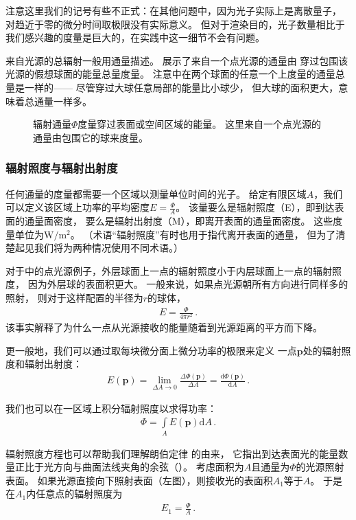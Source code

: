 注意这里我们的记号有些不正式：在其他问题中，因为光子实际上是离散量子，
对趋近于零的微分时间取极限没有实际意义。
但对于渲染目的，光子数量相比于我们感兴趣的度量是巨大的，在实践中这一细节不会有问题。

来自光源的总辐射一般用通量描述。
展示了来自一个点光源的通量由
穿过包围该光源的假想球面的能量总量度量。
注意中在两个球面的任意一个上度量的通量总量是一样的——
尽管穿过大球任意局部的能量比小球少，
但大球的面积更大，意味着总通量一样多。
\begin{figure}[htbp]
    \centering
    \caption{辐射通量$\varPhi$度量穿过表面或空间区域的能量。
        这里来自一个点光源的通量由包围它的球来度量。}
    \label{fig:5.6}
\end{figure}

\subsubsection*{辐射照度与辐射出射度}
任何通量的度量都需要一个区域以测量单位时间的光子。
给定有限区域$A$，我们可以定义该区域上功率的平均密度$\displaystyle E=\frac{\varPhi}{A}$。
该量要么是{\sffamily 辐射照度}（E），即到达表面的通量面密度，
要么是{\sffamily 辐射出射度}（M），即离开表面的通量面密度。
这些度量单位为$\text{W}/\text{m}^2$。
（术语“辐射照度”有时也用于指代离开表面的通量，
但为了清楚起见我们将为两种情况使用不同术语。）

对于中的点光源例子，外层球面上一点的辐射照度小于内层球面上一点的辐射照度，
因为外层球的表面积更大。
一般来说，如果点光源朝所有方向进行同样多的照射，
则对于这样配置的半径为$r$的球体，
\begin{align*}
    E=\frac{\varPhi}{4\pi r^2}\, .
\end{align*}
该事实解释了为什么一点从光源接收的能量随着到光源距离的平方而下降。

更一般地，我们可以通过取每块微分面上微分功率的极限来定义
一点$\bm p$处的辐射照度和辐射出射度：
\begin{align*}
    E(\bm p)=\lim\limits_{\Delta A\rightarrow 0}{\frac{\Delta \varPhi(\bm p)}{\Delta A}}=\frac{\mathrm{d}\varPhi(\bm p)}{\mathrm{d}A}\, .
\end{align*}

我们也可以在一区域上积分辐射照度以求得功率：
\begin{align*}
    \varPhi=\int\limits_A E(\bm p)\mathrm{d}A\, .
\end{align*}

辐射照度方程也可以帮助我们理解{\sffamily 朗伯定律}
的由来，
它指出到达表面光的能量数量正比于光方向与曲面法线夹角的余弦（）。
考虑面积为$A$且通量为$\varPhi$的光源照射表面。
如果光源直接向下照射表面（左图），则接收光的表面积$A_1$等于$A$。
于是在$A_1$内任意点的辐射照度为
\begin{align*}
    E_1=\frac{\varPhi}{A}\, .
\end{align*}

